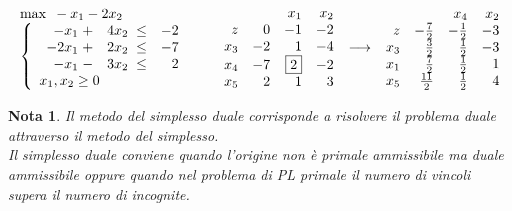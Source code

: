 \documentclass[10pt]{article}
\newtheorem{Not}{Nota}%
\begin{document}
\[
   \begin{array}{l}
        \max \mbox{\ }-x_1 - 2x_2 \\
        \left\{
        \begin{array}{l}
        \begin{array}{rrrr}
             -x_1 \;+&  4x_2 \;\leq &  -2 \\
            -2x_1 \;+&  2x_2 \;\leq &  -7 \\
             -x_1 \;-&  3x_2 \;\leq &   2 \\
        \end{array} \\
        x_1, x_2  \geq 0    
        \end{array}
        \right.
   \end{array}
\hfill
\hspace{0.4cm}
   \begin{array}{rrrrr}
          &    & x_1  & x_2  \\
       z  & 0 &  -1  & -2 \\          
      x_3 & -2 &  1  & -4 \\
      x_4 & -7  & \fbox{$2$}  & -2  \\
      x_5 & 2 &  1  & 3 \\
   \end{array}
\hfill
\hspace{0.2cm}
{\longrightarrow}
\hfill
\hspace{0.2cm}
   \begin{array}{rrrrr}
          &				& x_4  & x_2  \\
       z  & -\frac{7}{2} & -\frac{1}{2}  & -3 \\          
      x_3 & \frac{3}{2} &  \frac{1}{2}  & -3 \\
      x_1 & \frac{7}{2} & \frac{1}{2}  & 1 \\
      x_5 & \frac{11}{2} & \frac{1}{2}  & 4 \\
   \end{array}
\]

\begin{Not}
   Il metodo del simplesso duale corrisponde
   a risolvere il problema duale attraverso
   il metodo del simplesso.\\
   Il simplesso duale conviene quando
   l'origine non \`e primale ammissibile 
   ma duale ammissibile oppure quando nel problema di PL
   primale il numero di vincoli supera il numero di incognite.
\end{Not}

\bigskip
\end{document}

